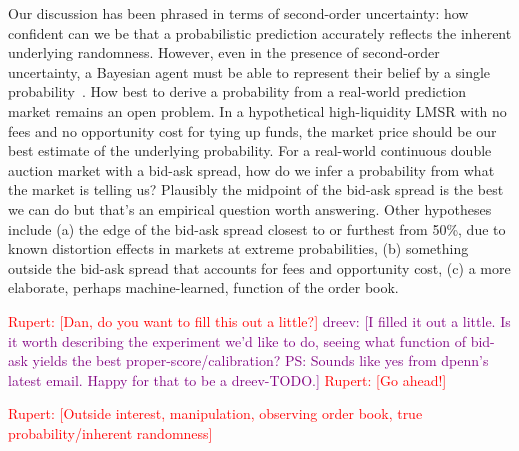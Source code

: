 \documentclass[sigconf,anonymous]{aamas}   %
\newcommand{\rupert}[1]{\ifnum\Chatty=1 \textcolor{red}   {Rupert: [#1]} \fi}
\newcommand{\dreev} [1]{\ifnum\Chatty=1 \textcolor{purple}{dreev:  [#1]} \fi}
\begin{document}
Our discussion has been phrased in terms of second-order uncertainty: how confident can we be that a probabilistic prediction accurately reflects the inherent underlying randomness. However, even in the presence of second-order uncertainty, a Bayesian agent must be able to represent their belief by a single probability~\cite{pearl1987}. 
How best to derive a probability from a real-world prediction market remains an open problem.
In a hypothetical high-liquidity LMSR with no fees and no opportunity cost for tying up funds, the market price should be our best estimate of the underlying probability.
For a real-world continuous double auction market with a bid-ask spread, how do we infer a probability from what the market is telling us?
Plausibly the midpoint of the bid-ask spread is the best we can do but that's an empirical question worth answering.
Other hypotheses include (a) the edge of the bid-ask spread closest to or furthest from 50\%, due to known distortion effects in markets at extreme probabilities, (b) something outside the bid-ask spread that accounts for fees and opportunity cost, (c) a more elaborate, perhaps machine-learned, function of the order book.

\rupert{Dan, do you want to fill this out a little?}
\dreev{I filled it out a little. Is it worth describing the experiment we'd like to do, seeing what function of bid-ask yields the best proper-score/calibration? PS: Sounds like yes from dpenn's latest email. Happy for that to be a dreev-TODO.}
\rupert{Go ahead!}

\rupert{Outside interest, manipulation, observing order book, true probability/inherent randomness}



 

\end{document}
